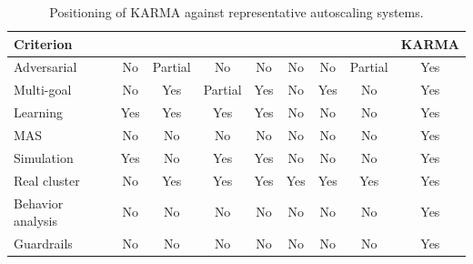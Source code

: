 \documentclass[journal]{IEEEtran}
\begin{document}
\begin{table}[t]
  \centering
  \caption{Positioning of KARMA against representative autoscaling systems.}
  \label{tab:autoscaling_criteria}
  \scriptsize
  \setlength{\tabcolsep}{2.2pt}
  \renewcommand{\arraystretch}{1.05}
  \begin{tabular}{lcccccccc}
    \toprule
    \textbf{Criterion} & \textbf{\cite{gymhpa2022}} & \textbf{\cite{aware2023}} & \textbf{\cite{Rossi2019}} & \textbf{\cite{QoSRL}} & \textbf{\cite{Zhou2024}} & \textbf{\cite{KOSMOS}} & \textbf{\cite{COPA}} & \textbf{KARMA} \\
    \midrule
    Adversarial        & No                         & Partial                   & No                        & No                    & No                       & No                     & Partial              & Yes            \\
    Multi-goal         & No                         & Yes                       & Partial                   & Yes                   & No                       & Yes                    & No                   & Yes            \\
    Learning           & Yes                        & Yes                       & Yes                       & Yes                   & No                       & No                     & No                   & Yes            \\
    MAS                & No                         & No                        & No                        & No                    & No                       & No                     & No                   & Yes            \\
    Simulation         & Yes                        & No                        & Yes                       & Yes                   & No                       & No                     & No                   & Yes            \\
    Real cluster       & No                         & Yes                       & Yes                       & Yes                   & Yes                      & Yes                    & Yes                  & Yes            \\
    Behavior analysis  & No                         & No                        & No                        & No                    & No                       & No                     & No                   & Yes            \\
    Guardrails         & No                         & No                        & No                        & No                    & No                       & No                     & No                   & Yes            \\
    \bottomrule
  \end{tabular}
\end{table}
\end{document}
